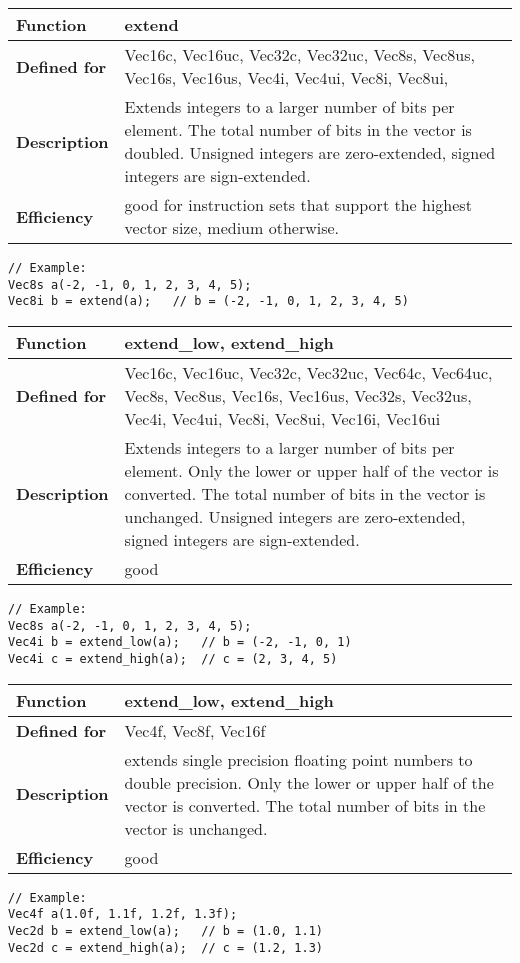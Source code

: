 \documentclass[vcl_manual.tex]{subfiles}
\begin{document}
\begin{tabular}{|p{30mm}|p{120mm}|}
\hline
\bfseries Function & extend \\ \hline
\bfseries Defined for & Vec16c, Vec16uc, Vec32c, Vec32uc, 
Vec8s, Vec8us, Vec16s, Vec16us,
Vec4i, Vec4ui, Vec8i, Vec8ui,  \\ \hline
\bfseries Description & Extends integers to a larger number of bits per element.
The total number of bits in the vector is doubled. 
Unsigned integers are zero-extended, signed integers are sign-extended. \\ \hline
\bfseries Efficiency & good for instruction sets that support the highest vector size, medium otherwise. \\ \hline
\end{tabular}
\begin{lstlisting}[frame=none]
// Example:
Vec8s a(-2, -1, 0, 1, 2, 3, 4, 5);
Vec8i b = extend(a);   // b = (-2, -1, 0, 1, 2, 3, 4, 5)
\end{lstlisting}


\begin{tabular}{|p{30mm}|p{120mm}|}
\hline
\bfseries Function & extend\_low, extend\_high \\ \hline
\bfseries Defined for & Vec16c, Vec16uc, Vec32c, Vec32uc, Vec64c, Vec64uc,  
Vec8s, Vec8us, Vec16s, Vec16us, Vec32s, Vec32us, 
Vec4i, Vec4ui, Vec8i, Vec8ui, Vec16i, Vec16ui \\ \hline
\bfseries Description & Extends integers to a larger number of bits per element.
Only the lower or upper half of the vector is converted. The total number of bits in the vector is unchanged. 
Unsigned integers are zero-extended, signed integers are sign-extended. \\ \hline
\bfseries Efficiency & good \\ \hline
\end{tabular}
\begin{lstlisting}[frame=none]
// Example:
Vec8s a(-2, -1, 0, 1, 2, 3, 4, 5);
Vec4i b = extend_low(a);   // b = (-2, -1, 0, 1)
Vec4i c = extend_high(a);  // c = (2, 3, 4, 5)
\end{lstlisting}


\begin{tabular}{|p{30mm}|p{120mm}|}
\hline
\bfseries Function & extend\_low, extend\_high \\ \hline
\bfseries Defined for & Vec4f, Vec8f, Vec16f \\ \hline
\bfseries Description & extends single precision floating point numbers to double precision. 
Only the lower or upper half of the vector is converted. The total number of bits in the vector is unchanged.  \\ \hline
\bfseries Efficiency & good \\ \hline
\end{tabular}
\begin{lstlisting}[frame=none]
// Example:
Vec4f a(1.0f, 1.1f, 1.2f, 1.3f);
Vec2d b = extend_low(a);   // b = (1.0, 1.1)
Vec2d c = extend_high(a);  // c = (1.2, 1.3)
\end{lstlisting}
\end{document}
